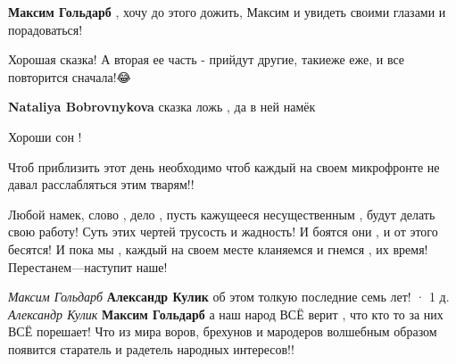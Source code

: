 \begin{itemize}
\begin{itemize}
 
\textbf{Максим Гольдарб} , хочу до этого дожить, Максим и увидеть своими глазами и порадоваться!
\end{itemize}

 
Хорошая сказка! А вторая ее часть - прийдут другие, такиеже еже, и все повторится сначала!😂

\begin{itemize}
 
\textbf{Nataliya Bobrovnykova} сказка ложь , да в ней намёк
\end{itemize}

 
Хороши сон !


Чтоб приблизить этот день необходимо чтоб каждый на своем микрофронте не давал
расслабляться этим тварям!!

Любой намек, слово , дело , пусть кажущееся несущественным , будут делать свою
работу! Суть этих чертей трусость и жадность! И боятся они , и от этого
бесятся! И пока мы , каждый на своем месте кланяемся и гнемся , их время!
Перестанем—наступит наше!

\begin{itemize}
\emph{Максим Гольдарб}
\textbf{Александр Кулик} об этом толкую последние семь лет!
 · 1 д.
\emph{Александр Кулик}
\textbf{Максим Гольдарб} а наш народ ВСЁ верит , что кто то за них ВСЁ порешает! Что из мира воров, брехунов и мародеров волшебным образом появится старатель и радетель народных интересов!!
\end{itemize}

\end{itemize}

